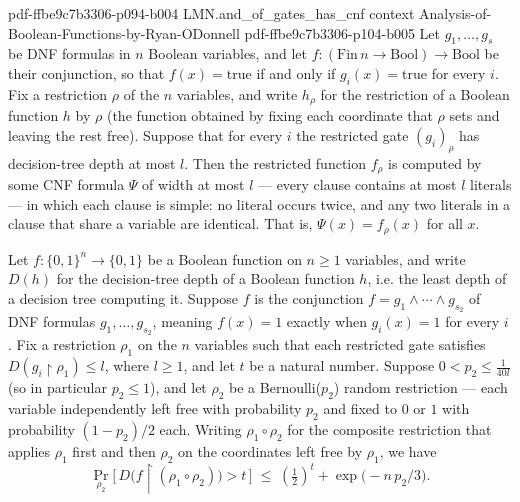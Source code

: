 \begin{lemma}
  {pdf-ffbe9c7b3306-p094-b004}
\proofstep
  {LMN.and_of_gates_has_cnf}
  {context}
  {Analysis-of-Boolean-Functions-by-Ryan-ODonnell}
  {pdf-ffbe9c7b3306-p104-b005}
Let $g_1,\dots,g_s$ be DNF formulas in $n$ Boolean variables, and let $f :
(\mathrm{Fin}\,n \to \mathrm{Bool}) \to \mathrm{Bool}$ be their conjunction, so that
$f(x) = \mathrm{true}$ if and only if $g_i(x) = \mathrm{true}$ for every $i$. Fix a
restriction $\rho$ of the $n$ variables, and write $h_\rho$ for the restriction of a
Boolean function $h$ by $\rho$ (the function obtained by fixing each coordinate that
$\rho$ sets and leaving the rest free). Suppose that for every $i$ the restricted gate
$(g_i)_\rho$ has decision-tree depth at most $l$. Then the restricted function $f_\rho$
is computed by some CNF formula $\Psi$ of width at most $l$ — every clause contains at
most $l$ literals — in which each clause is simple: no literal occurs twice, and any two
literals in a clause that share a variable are identical. That is, $\Psi(x) = f_\rho(x)$
for all $x$.
\end{lemma}

\begin{lemma}
\label{LMN.depth3_second_stage_bound}
\leanok
{}
Let $f:\{0,1\}^n\to\{0,1\}$ be a Boolean function on $n\ge 1$ variables, and write
$D(h)$ for the decision-tree depth of a Boolean function $h$, i.e. the least depth of a
decision tree computing it. Suppose $f$ is the conjunction $f=g_1\wedge\cdots\wedge
g_{s_2}$ of DNF formulas $g_1,\dots,g_{s_2}$, meaning $f(x)=1$ exactly when $g_i(x)=1$
for every $i$. Fix a restriction $\rho_1$ on the $n$ variables such that each restricted
gate satisfies $D(g_i\!\restriction\!\rho_1)\le l$, where $l\ge 1$, and let $t$ be a
natural number. Suppose $0<p_2\le \tfrac{1}{40l}$ (so in particular $p_2\le 1$), and let
$\rho_2$ be a Bernoulli($p_2$) random restriction — each variable independently left
free with probability $p_2$ and fixed to $0$ or $1$ with probability $(1-p_2)/2$ each.
Writing $\rho_1\circ\rho_2$ for the composite restriction that applies $\rho_1$ first
and then $\rho_2$ on the coordinates left free by $\rho_1$, we have
\[
\Pr_{\rho_2}\!\big[\, D\big(f\!\restriction\!(\rho_1\circ\rho_2)\big) > t
\,\big]\;\le\;\left(\tfrac12\right)^{t}+\exp\!\big(-n\,p_2/3\big).
\]
\end{lemma}

